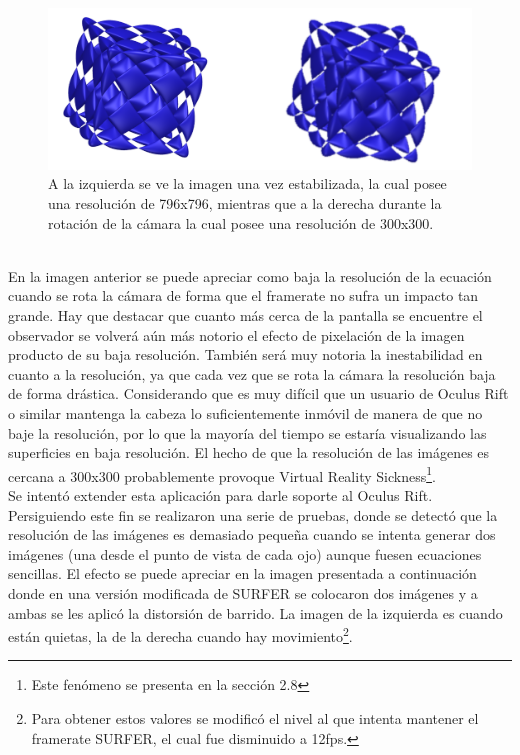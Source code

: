 \documentclass[12pt]{article}
\begin{document}
\begin{figure}[h]
\includegraphics[width=\textwidth]{surfer_en_movimiento.png}
\caption{A la izquierda se ve la imagen una vez estabilizada, la cual posee una resolución de 796x796, mientras que a la derecha durante la rotación de la cámara la cual posee una resolución de 300x300.}
\end{figure}
\\En la imagen anterior se puede apreciar como baja la resolución de la ecuación cuando se rota la cámara de forma  que el framerate no sufra un impacto tan grande. Hay que destacar que cuanto más cerca de la pantalla se encuentre el observador se volverá aún más notorio el efecto de pixelación de la imagen producto de su baja resolución. También será muy notoria la inestabilidad en cuanto a la resolución, ya que cada vez que se rota la cámara la resolución baja de forma drástica. Considerando que es muy difícil que un  usuario de Oculus Rift o similar mantenga la cabeza lo suficientemente inmóvil de manera de que no baje la resolución, por lo que la mayoría del tiempo se estaría visualizando las superficies en baja resolución. El hecho de que la resolución de las imágenes es cercana a 300x300 probablemente provoque Virtual Reality Sickness\footnote{Este fenómeno se presenta en la sección 2.8}.
\\Se intentó extender esta aplicación para darle soporte al Oculus Rift. Persiguiendo este fin se realizaron una serie de pruebas, donde se detectó que la resolución de las imágenes es demasiado pequeña cuando se intenta generar dos imágenes (una desde el punto de vista de cada ojo) aunque fuesen ecuaciones sencillas. El efecto se puede apreciar en la imagen presentada a continuación donde en una versión modificada de SURFER se colocaron dos imágenes y a ambas se les aplicó la distorsión de barrido. La imagen de la izquierda es cuando están quietas, la de la derecha cuando hay movimiento\footnote{Para obtener estos valores se modificó el nivel al que intenta mantener el framerate SURFER, el cual fue disminuido a 12fps.}.
\end{document}
